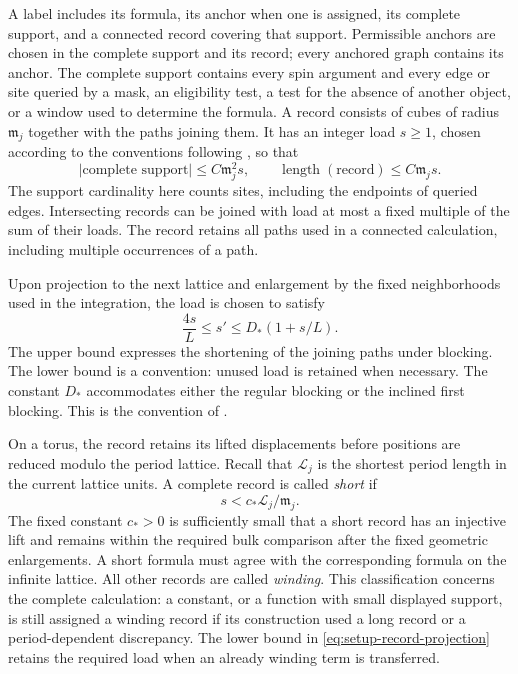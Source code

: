 A label includes its formula, its anchor when one is assigned, its
complete support, and a connected record covering that support.
Permissible anchors are chosen in the complete support and its record;
every anchored graph contains its anchor.  The complete support contains every spin argument and every edge or site
queried by a mask, an eligibility test, a test for the absence of another
object, or a window used to determine the formula.  A record consists of
cubes of radius $\mathfrak m_j$ together with the paths joining them.
It has an integer load $s\ge1$, chosen according to the conventions
following , so that
\begin{equation}
 |\text{complete support}|\le C\mathfrak m_j^2s,
 \qquad
 \operatorname{length}(\text{record})\le C\mathfrak m_js.
 \label{eq:setup-record-size}
\end{equation}
The support cardinality here counts sites, including the endpoints of
queried edges.  Intersecting records can be joined with load at most a
fixed multiple of the sum of their loads.  The record retains all paths
used in a connected calculation, including multiple occurrences of a
path.

Upon projection to the next lattice and enlargement by the fixed
neighborhoods used in the integration, the load is chosen to satisfy
\begin{equation}
       \frac{4s}{L}\le s'\le D_*(1+s/L).
 \label{eq:setup-record-projection}
\end{equation}
The upper bound expresses the shortening of the joining paths under
blocking.  The lower bound is a convention: unused load is retained
when necessary.  The constant $D_*$ accommodates either the regular
blocking or the inclined first blocking.  This is the convention of
.

On a torus, the record retains its lifted displacements before positions
are reduced modulo the period lattice.  Recall that $\mathcal L_j$ is
the shortest period length in the current lattice units.  A complete record is called
\emph{short} if
\begin{equation}
                         s<c_*\mathcal L_j/\mathfrak m_j.
 \label{eq:setup-short-record}
\end{equation}
The fixed constant $c_*>0$ is sufficiently small that a short record has
an injective lift and remains within the required bulk comparison after
the fixed geometric enlargements.  A short formula must agree with the
corresponding formula on the infinite lattice.  All other records are
called \emph{winding}.  This classification concerns the complete
calculation: a constant, or a function with small displayed support, is
still assigned a winding record if its construction used a long record
or a period-dependent discrepancy.  The lower bound in
\eqref{eq:setup-record-projection} retains the required load when an
already winding term is transferred.


